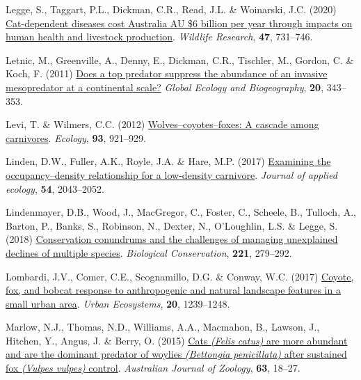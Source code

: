 \documentclass[preprint, 3p, authoryear]{elsarticle} %
\newlength{\cslhangindent}
\newlength{\cslentryspacingunit} %
\newenvironment{CSLReferences}[2] %
 {%
  \setlength{\parindent}{0pt}
  \ifodd #1
  \let\oldpar\par
  \def\par{\hangindent=\cslhangindent\oldpar}
  \fi
  \setlength{\parskip}{#2\cslentryspacingunit}
 }%
 {}
\begin{document}
\begin{CSLReferences}{1}{0}
\leavevmode{}%
Legge, S., Taggart, P.L., Dickman, C.R., Read, J.L. \& Woinarski, J.C. (2020) \href{https://doi.org/10.1071/WR20089}{Cat-dependent diseases cost {Australia AU \$6} billion per year through impacts on human health and livestock production}. \emph{Wildlife Research}, \textbf{47}, 731--746.

\leavevmode{}%
Letnic, M., Greenville, A., Denny, E., Dickman, C.R., Tischler, M., Gordon, C. \& Koch, F. (2011) \href{https://doi.org/10.1111/j.1466-8238.2010.00600.x}{Does a top predator suppress the abundance of an invasive mesopredator at a continental scale?} \emph{Global Ecology and Biogeography}, \textbf{20}, 343--353.

\leavevmode{}%
Levi, T. \& Wilmers, C.C. (2012) \href{https://doi.org/10.1890/11-0165.1}{Wolves--coyotes--foxes: A cascade among carnivores}. \emph{Ecology}, \textbf{93}, 921--929.

\leavevmode{}%
Linden, D.W., Fuller, A.K., Royle, J.A. \& Hare, M.P. (2017) \href{https://doi.org/10.1111/1365-2664.12883}{Examining the occupancy--density relationship for a low-density carnivore}. \emph{Journal of applied ecology}, \textbf{54}, 2043--2052.

\leavevmode{}%
Lindenmayer, D.B., Wood, J., MacGregor, C., Foster, C., Scheele, B., Tulloch, A., Barton, P., Banks, S., Robinson, N., Dexter, N., O'Loughlin, L.S. \& Legge, S. (2018) \href{https://doi.org/10.1016/j.biocon.2018.03.007}{Conservation conundrums and the challenges of managing unexplained declines of multiple species}. \emph{Biological Conservation}, \textbf{221}, 279--292.

\leavevmode{}%
Lombardi, J.V., Comer, C.E., Scognamillo, D.G. \& Conway, W.C. (2017) \href{https://doi.org/10.1007/s11252-017-0676-z}{Coyote, fox, and bobcat response to anthropogenic and natural landscape features in a small urban area}. \emph{Urban Ecosystems}, \textbf{20}, 1239--1248.

\leavevmode{}%
Marlow, N.J., Thomas, N.D., Williams, A.A., Macmahon, B., Lawson, J., Hitchen, Y., Angus, J. \& Berry, O. (2015) \href{https://doi.org/10.1071/ZO14024}{Cats \emph{({Felis catus})} are more abundant and are the dominant predator of woylies \emph{({Bettongia penicillata})} after sustained fox \emph{({Vulpes vulpes})} control}. \emph{{A}ustralian Journal of Zoology}, \textbf{63}, 18--27.


\end{CSLReferences}
\end{document}
